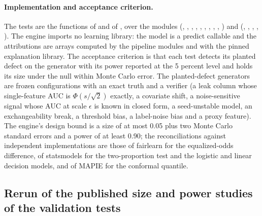 \paragraph{Implementation and acceptance criterion.} The tests are the functions of  and  of  \vtEngineVersion{}, over the modules  (, , ,
, , , , , , ) and  (, , , , ). The engine imports no learning library: the model is a predict callable and
the attributions are arrays computed by the pipeline modules  and  with the pinned explanation library. The acceptance criterion is that each test detects its planted defect on the generator with its power reported at the 5 percent level and holds its size under the null within Monte Carlo error. The planted-defect generators are frozen configurations with an exact truth and a
verifier (a leak column whose single-feature AUC is $\Phi(s/\sqrt2)$ exactly, a covariate shift, a noise-sensitive signal whose AUC at scale $\epsilon$ is known in closed form, a seed-unstable model, an exchangeability break, a threshold bias, a label-noise bias and a proxy feature). The engine's design bound is a size of at most 0.05 plus two Monte Carlo standard errors and a power of
at least 0.90; the reconciliations against independent implementations are those of fairlearn for the equalized-odds difference, of statsmodels for the two-proportion test and the logistic and linear decision models, and of MAPIE for the conformal quantile.
\par\endgroup

\subsection{Rerun of the published size and power studies of the validation tests}
\label{sec:m37}

